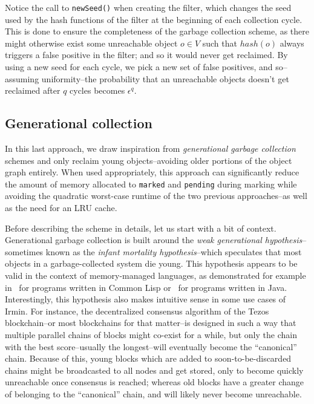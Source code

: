 Notice the call to \texttt{newSeed()} when creating the filter, which changes the seed used by the hash functions of the filter at the beginning of each collection cycle. This is done to ensure the completeness of the garbage collection scheme, as there might otherwise exist some unreachable object \(o \in V\) such that \(hash(o)\) always triggers a false positive in the filter; and so it would never get reclaimed. By using a new seed for each cycle, we pick a new set of false positives, and so--assuming uniformity--the probability that an unreachable objects doesn't get reclaimed after \(q\) cycles becomes \(\epsilon^q\).



\subsection{Generational collection}

In this last approach, we draw inspiration from \emph{generational garbage collection} schemes and only reclaim young objects--avoiding older portions of the object graph entirely. When used appropriately, this approach can significantly reduce the amount of memory allocated to \texttt{marked} and \texttt{pending} during marking while avoiding the quadratic worst-case runtime of the two previous approaches--as well as the need for an LRU cache.

\bigskip
Before describing the scheme in details, let us start with a bit of context. Generational garbage collection is built around the \emph{weak generational hypothesis}--sometimes known as the \emph{infant mortality hypothesis}--which speculates that most objects in a garbage-collected system die young. This hypothesis appears to be valid in the context of memory-managed languages, as demonstrated for example in~\cite{zorn89} for programs written in Common Lisp or~\cite{dieck99} for programs written in Java. Interestingly, this hypothesis also makes intuitive sense in some use cases of Irmin. For instance, the decentralized consensus algorithm of the Tezos blockchain--or most blockchains for that matter--is designed in such a way that multiple parallel chains of blocks might co-exist for a while, but only the chain with the best score--usually the longest--will eventually become the ``canonical'' chain. Because of this, young blocks which are added to soon-to-be-discarded chains might be broadcasted to all nodes and get stored, only to become quickly unreachable once consensus is reached; whereas old blocks have a greater change of belonging to the ``canonical'' chain, and will likely never become unreachable.

